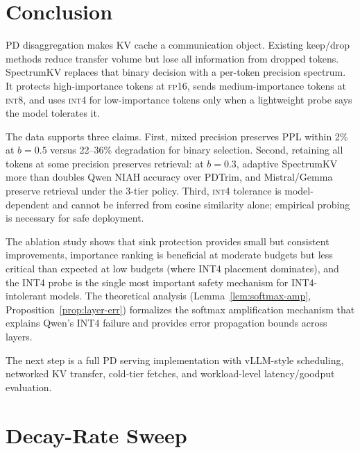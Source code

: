 \documentclass[11pt]{article}
\newcommand{\method}{SpectrumKV}
\newcommand{\niah}{NIAH}
\newcommand{\budget}{b}
\newcommand{\fp}{\textsc{fp16}}
\newcommand{\intviii}{\textsc{int8}}
\newcommand{\intiv}{\textsc{int4}}
\theoremstyle{plain}
\theoremstyle{definition}
\begin{document}
\section{Conclusion}
\label{sec:conclusion}

PD disaggregation makes KV cache a communication object.  Existing keep/drop methods reduce transfer volume but lose all information from dropped tokens.  \method{} replaces that binary decision with a per-token precision spectrum.  It protects high-importance tokens at \fp{}, sends medium-importance tokens at \intviii{}, and uses \intiv{} for low-importance tokens only when a lightweight probe says the model tolerates it.

The data supports three claims.  First, mixed precision preserves PPL within 2\% at $\budget=0.5$ versus 22--36\% degradation for binary selection.  Second, retaining all tokens at some precision preserves retrieval: at $\budget=0.3$, adaptive \method{} more than doubles Qwen \niah{} accuracy over PDTrim, and Mistral/Gemma preserve retrieval under the 3-tier policy.  Third, \intiv{} tolerance is model-dependent and cannot be inferred from cosine similarity alone; empirical probing is necessary for safe deployment.

The ablation study shows that sink protection provides small but consistent improvements, importance ranking is beneficial at moderate budgets but less critical than expected at low budgets (where INT4 placement dominates), and the INT4 probe is the single most important safety mechanism for INT4-intolerant models.  The theoretical analysis (Lemma~\ref{lem:softmax-amp}, Proposition~\ref{prop:layer-err}) formalizes the softmax amplification mechanism that explains Qwen's INT4 failure and provides error propagation bounds across layers.

The next step is a full PD serving implementation with vLLM-style scheduling, networked KV transfer, cold-tier fetches, and workload-level latency/goodput evaluation.

\appendix

\section{Decay-Rate Sweep}
\label{app:decay}
\end{document}
